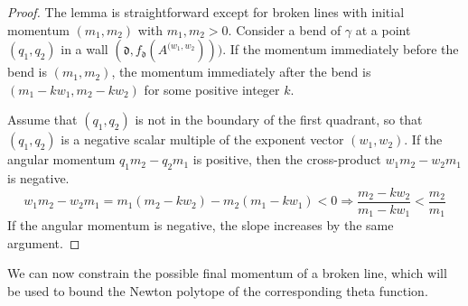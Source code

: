 \documentclass[11pt]{amsart}
\theoremstyle{remark}
\numberwithin{equation}{section}
\newcommand{\fd}{\mathfrak{d}}
\begin{document}
\begin{proof}
The lemma is straightforward except for broken lines with initial momentum $(m_1,m_2)$ with $m_1,m_2>0$.  
Consider a bend of $\gamma$ at a point $(q_1,q_2)$ in a wall $(\fd,f_{\fd}(A^{(w_1,w_2})))$.  If the momentum immediately before the bend is $(m_1,m_2)$, the momentum immediately after the bend is $(m_1-kw_1,m_2-kw_2)$ for some positive integer $k$.  

Assume that $(q_1,q_2)$ is not in the boundary of the first quadrant, so that $(q_1,q_2)$ is a negative scalar multiple of the exponent vector $(w_1,w_2)$. If the angular momentum $q_1m_2-q_2m_1$ is positive, then the cross-product $w_1m_2-w_2m_1$ is negative. 
\[ w_1m_2-w_2m_1=m_1(m_2-kw_2)-m_2(m_1-kw_1)<0 \Rightarrow \frac{m_2-kw_2}{m_1-kw_1} < \frac{m_2}{m_1}\]
If the angular momentum is negative, the slope increases by the same argument.
\end{proof}

We can now constrain the possible final momentum of a broken line, which will be used to bound the Newton polytope of the corresponding theta function.
\end{document}
